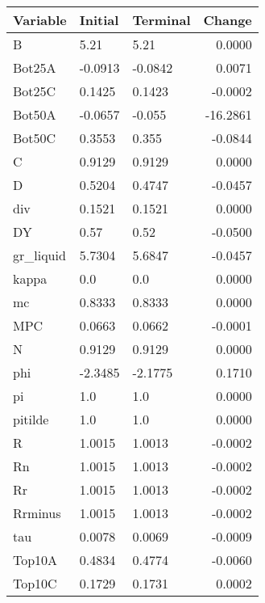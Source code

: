 \begin{table}
\centering
\label{tab:stst_comparison_no_ZLB_limit_permanent}
\begin{tabular}{lllr}
\toprule
                Variable & Initial & Terminal &   Change \\
\midrule
                       B &    5.21 &     5.21 &   0.0000 \\
                  Bot25A & -0.0913 &  -0.0842 &   0.0071 \\
                  Bot25C &  0.1425 &   0.1423 &  -0.0002 \\
                  Bot50A & -0.0657 &   -0.055 & -16.2861 \\
                  Bot50C &  0.3553 &    0.355 &  -0.0844 \\
                       C &  0.9129 &   0.9129 &   0.0000 \\
                       D &  0.5204 &   0.4747 &  -0.0457 \\
                     div &  0.1521 &   0.1521 &   0.0000 \\
                      DY &    0.57 &     0.52 &  -0.0500 \\
               gr\_liquid &  5.7304 &   5.6847 &  -0.0457 \\
                   kappa &     0.0 &      0.0 &   0.0000 \\
                      mc &  0.8333 &   0.8333 &   0.0000 \\
                     MPC &  0.0663 &   0.0662 &  -0.0001 \\
                       N &  0.9129 &   0.9129 &   0.0000 \\
                     phi & -2.3485 &  -2.1775 &   0.1710 \\
                      pi &     1.0 &      1.0 &   0.0000 \\
                 pitilde &     1.0 &      1.0 &   0.0000 \\
                       R &  1.0015 &   1.0013 &  -0.0002 \\
                      Rn &  1.0015 &   1.0013 &  -0.0002 \\
                      Rr &  1.0015 &   1.0013 &  -0.0002 \\
                 Rrminus &  1.0015 &   1.0013 &  -0.0002 \\
                     tau &  0.0078 &   0.0069 &  -0.0009 \\
                  Top10A &  0.4834 &   0.4774 &  -0.0060 \\
                  Top10C &  0.1729 &   0.1731 &   0.0002 \\

\end{tabular}
\end{table}
